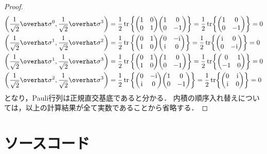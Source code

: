 \documentclass{report}
\begin{document}
$$\begin{proof}
\begin{align}
        \qty(\frac{1}{\sqrt{2}}\hat{\sigma}^0, \frac{1}{\sqrt{2}}\hat{\sigma}^3) &= \frac{1}{2}\tr\qty{\mqty(1 & 0 \\ 0 & 1)\mqty(1 & 0 \\ 0 & -1)} = \frac{1}{2}\tr{\mqty(1 & 0 \\ 0 & -1)} = 0 \\
        \qty(\frac{1}{\sqrt{2}}\hat{\sigma}^1, \frac{1}{\sqrt{2}}\hat{\sigma}^2) &= \frac{1}{2}\tr\qty{\mqty(0 & 1 \\ 1 & 0)\mqty(0 & -\i \\ \i & 0)} = \frac{1}{2}\tr{\mqty(\i & 0 \\ 0 & -\i)} = 0 \\ 
        \qty(\frac{1}{\sqrt{2}}\hat{\sigma}^1, \frac{1}{\sqrt{2}}\hat{\sigma}^3) &= \frac{1}{2}\tr\qty{\mqty(0 & 1 \\ 1 & 0)\mqty(1 & 0 \\ 0 & -1)} = \frac{1}{2}\tr{\mqty(0 & 1 \\ -1 & 0)} = 0 \\ 
        \qty(\frac{1}{\sqrt{2}}\hat{\sigma}^2, \frac{1}{\sqrt{2}}\hat{\sigma}^3) &= \frac{1}{2}\tr\qty{\mqty(0 & -\i \\ \i & 0)\mqty(1 & 0 \\ 0 & -1)} = \frac{1}{2}\tr{\mqty(0 & \i \\ \i & 0)} = 0 
      \end{align}
      となり，Pauli行列は正規直交基底であると分かる．
      内積の順序入れ替えについては，以上の計算結果が全て実数であることから省略する．
    \end{proof}
  \chapter{ソースコード}
    \inputminted[linenos, frame=lines, label=qst-code]{python}{../../experiment/qst/main.py}
\end{document}
